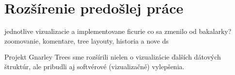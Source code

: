 \section{Rozšírenie predošlej práce}
jednotlive vizualizacie a implementovane ficurie
co sa zmenilo od bakalarky? zoomovanie, komentare, tree layouty, historia a nove ds

Projekt Gnarley Trees sme rozšírili nielen o vizualizácie ďalších dátových
štruktúr, ale pribudli aj softvérové (vizualizačné) vylepšenia.

